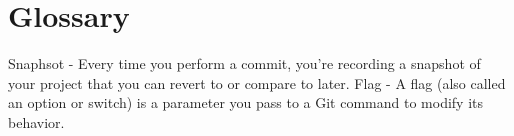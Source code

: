 \chapter{Glossary}
Snaphsot - Every time you perform a commit, you’re recording a snapshot of your project that you can revert to or compare to later.\newline
Flag - A flag (also called an option or switch) is a parameter you pass to a Git command to modify its behavior.